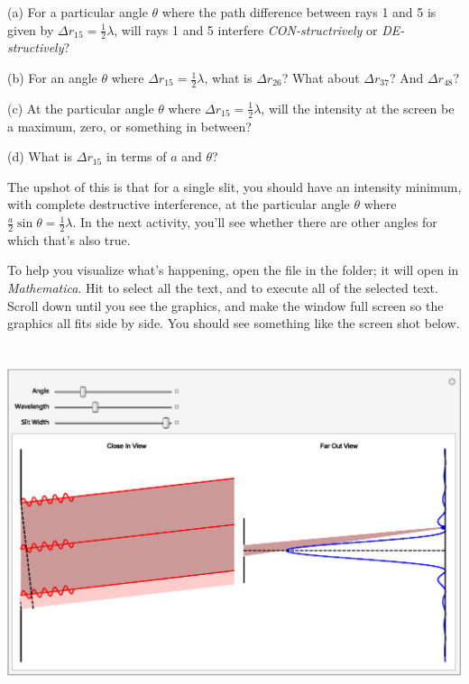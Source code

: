 (a) For a particular angle $\theta$ where the path difference between rays 1 and 5 is given by $\Delta r_{15}=\frac{1}{2}\lambda$, will rays 1 and 5 interfere \textit{CON-structrively} or \textit{DE-structively}?
\answerspace{0.4in}

(b) For an angle $\theta$ where $\Delta r_{15}=\frac{1}{2}\lambda$, what is $\Delta r_{26}$?  What about $\Delta r_{37}$? And $\Delta r_{48}$?
\answerspace{0.5in}

(c) At the particular angle $\theta$ where $\Delta r_{15}=\frac{1}{2}\lambda$, will the intensity at the screen be a maximum, zero, or something in between?
\answerspace{0.4in}

(d) What is $\Delta r_{15}$ in terms of $a$ and $\theta$?
\answerspace{0.4in}

The upshot of this is that for a single slit, you should have an intensity minimum, with complete destructive interference, at the particular angle $\theta$ where $\frac{a}{2} \sin \theta = \frac{1}{2}\lambda$.  In the next activity, you'll see whether there are other angles for which that's also true.

\pagebreak[3]
To help you visualize what's happening, open the file  in the \filename{\coursefolder} folder; 
it will open in \textit{Mathematica}.  Hit  to select all the text, and  
to execute all of the selected text.  Scroll down until you see the graphics, and make the window full screen so the graphics all fits side by side.  You should see something like the screen shot below.

{\centering \includegraphics[height=4.1in]{diffraction_of_light/one_slit_screengrab.eps} \par}

